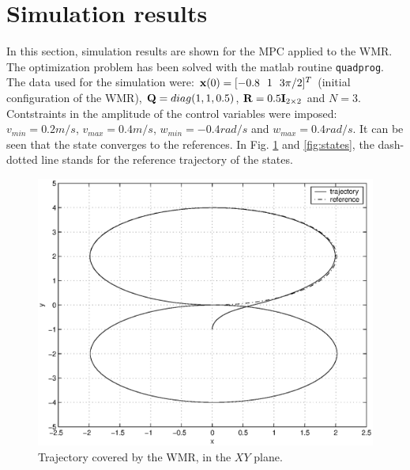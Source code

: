 \documentclass[twocolumn]{IEEEtran} %
\begin{document}
\section{Simulation results}\label{sec:simulations}
In this section, simulation results are shown for the MPC applied to the WMR. The optimization problem has been solved with the {\sc matlab} routine {\tt quadprog}. The data used for the simulation were: ${\bf x}(0)=[-0.8~~1~~3\pi/2]^T$ (initial configuration of the WMR), ${\bf Q}=diag(1,1,0.5)$, ${\bf R}=0.5{\bf I}_{2\times 2}$ and $N=3$. Contstraints in the amplitude of the control variables were imposed: $v_{min}=0.2 m/s$, $v_{max}=0.4 m/s$, $w_{min}=-0.4 rad/s$ and $w_{max}=0.4 rad/s$. It can be seen that the state converges to the references. In Fig. \ref{fig:traj8} and \ref{fig:states}, the dash-dotted line stands for the reference trajectory of the states. 
\begin{figure}
	\centering	
	\includegraphics[width=.99\linewidth]{Figures/traj8.eps}
	\caption{Trajectory covered by the WMR, in the $XY$ plane.}
	\label{fig:traj8}
\end{figure}
\end{document}
